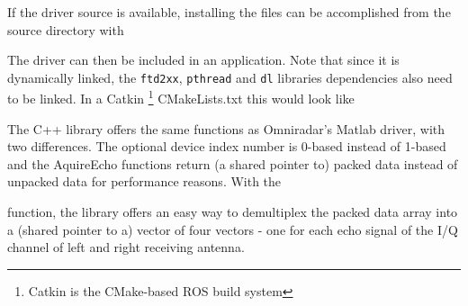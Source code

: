 If the driver source is available, installing the files can be
accomplished from the source directory with

\begin{Shaded}
\begin{Highlighting}[]
\KeywordTok{\&\&} 
\end{Highlighting}
\end{Shaded}

The driver can then be included in an application. Note that since it is
dynamically linked, the \texttt{ftd2xx}, \texttt{pthread} and
\texttt{dl} libraries dependencies also need to be linked. In a Catkin
\footnote{Catkin is the CMake-based ROS build system} CMakeLists.txt
this would look like

\begin{Shaded}
\begin{Highlighting}[]
\NormalTok{(}
\NormalTok{)}
\end{Highlighting}
\end{Shaded}

The C++ library offers the same functions as Omniradar's Matlab driver,
with two differences. The optional device index number is 0-based
instead of 1-based and the AquireEcho functions return (a shared pointer
to) packed data instead of unpacked data for performance reasons. With
the

\begin{Shaded}
\begin{Highlighting}[]
 
\end{Highlighting}
\end{Shaded}

function, the library offers an easy way to demultiplex the packed data
array into a (shared pointer to a) vector of four vectors - one for each
echo signal of the I/Q channel of left and right receiving antenna.

